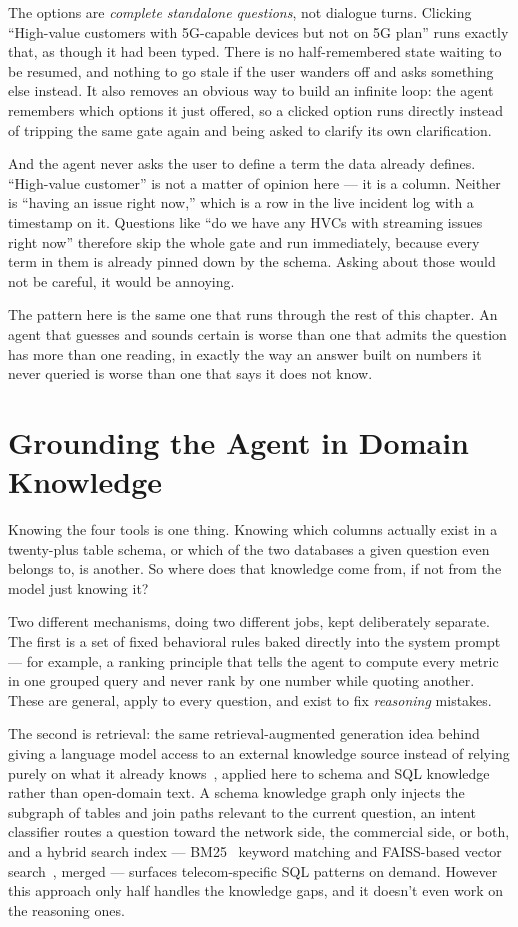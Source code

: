 The options are \emph{complete standalone questions}, not dialogue turns.
Clicking ``High-value customers with 5G-capable devices but not on 5G
plan'' runs exactly that, as though it had been typed. There is no
half-remembered state waiting to be resumed, and nothing to go stale if
the user wanders off and asks something else instead. It also removes an
obvious way to build an infinite loop: the agent remembers which options
it just offered, so a clicked option runs directly instead of tripping
the same gate again and being asked to clarify its own clarification.

And the agent never asks the user to define a term the data already
defines. ``High-value customer'' is not a matter of opinion here --- it
is a column. Neither is ``having an issue right now,'' which is a row in
the live incident log with a timestamp on it. Questions like ``do we have
any HVCs with streaming issues right now'' therefore skip the whole gate
and run immediately, because every term in them is already pinned down by
the schema. Asking about those would not be careful, it would be
annoying.

The pattern here is the same one that runs through the rest of this
chapter. An agent that guesses and sounds certain is worse than one that
admits the question has more than one reading, in exactly the way an
answer built on numbers it never queried is worse than one that says it
does not know.

\section{Grounding the Agent in Domain Knowledge}

Knowing the four tools is one thing. Knowing which columns actually
exist in a twenty-plus table schema, or which of the two databases a
given question even belongs to, is another. So where does that
knowledge come from, if not from the model just knowing it?

Two different mechanisms, doing two different jobs, kept deliberately
separate. The first is a set of fixed behavioral rules baked directly
into the system prompt --- for example, a ranking principle that tells
the agent to compute every metric in one grouped query and never rank
by one number while quoting another. These are general, apply to every
question, and exist to fix \emph{reasoning} mistakes.

The second is retrieval: the same retrieval-augmented generation idea
behind giving a language model access to an external knowledge source
instead of relying purely on what it already knows~\cite{rag}, applied
here to schema and SQL knowledge rather than open-domain text. A schema
knowledge graph only injects the subgraph of tables and join paths
relevant to the current question, an intent classifier routes a
question toward the network side, the commercial side, or both, and a
hybrid search index --- BM25~\cite{bm25} keyword matching and FAISS-based
vector search~\cite{faiss}, merged --- surfaces telecom-specific SQL
patterns on demand. However this approach only half handles the knowledge gaps,
and it doesn't even work on the reasoning ones.

